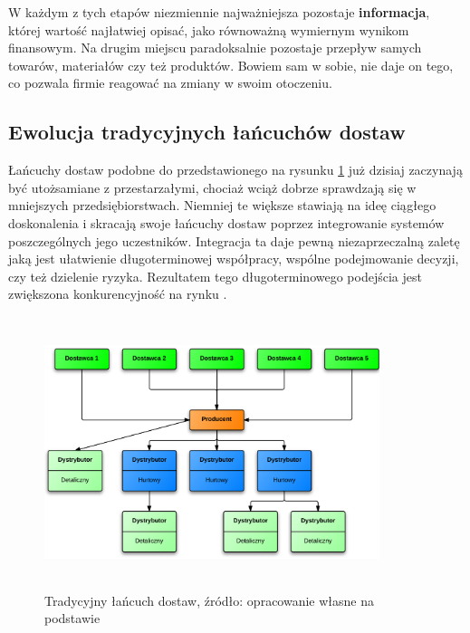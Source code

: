 	W każdym z tych etapów niezmiennie najważniejsza 
	pozostaje \textbf{informacja}, której wartość najłatwiej
	opisać, jako równoważną wymiernym wynikom finansowym. 
	Na drugim miejscu paradoksalnie pozostaje przepływ
	samych towarów, materiałów czy też produktów. 
	Bowiem sam w sobie, nie daje on tego, co pozwala
	firmie reagować na zmiany w swoim otoczeniu.
	
	\subsection{Ewolucja tradycyjnych łańcuchów dostaw}
		\hspace{15pt}Łańcuchy dostaw podobne do przedstawionego na rysunku \ref{fig:simple_supply_chain} już dzisiaj 
		zaczynają być utożsamiane z przestarzałymi, chociaż
		wciąż dobrze sprawdzają się w mniejszych przedsiębiorstwach. 
		Niemniej te większe stawiają na ideę ciągłego doskonalenia
		i skracają swoje łańcuchy dostaw poprzez integrowanie 
		systemów poszczególnych jego uczestników.
		Integracja ta daje pewną niezaprzeczalną zaletę jaką jest ułatwienie 
		długoterminowej współpracy, wspólne podejmowanie decyzji, czy też
		dzielenie ryzyka. Rezultatem tego długoterminowego
		podejścia jest zwiększona konkurencyjność na rynku \cite{zarzadzanie_lancuchem_dostaw_w_dobie_gospodarki_elektroniczej}.\\
		
		\begin{figure}[h]
			\centering
			\includegraphics[width=370px, height=300px]{images/BasicSupplyChain}
			\caption[Schemat budowy prostego łańcucha dostaw]{Tradycyjny łańcuch dostaw, źródło: opracowanie własne na podstawie \cite{zarzadzanie_lancuchem_dostaw_w_dobie_gospodarki_elektroniczej}}
			\label{fig:simple_supply_chain}
		\end{figure}		
		
